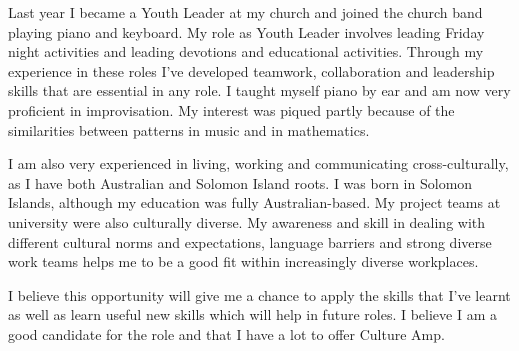 \documentclass[12pt, a4paper]{awesome-cv} %
\newcommand{\company}{Culture Amp}
\begin{document}
\begin{cvletter}
Last year I became a Youth Leader at my church and joined the church band playing piano and keyboard. My role as Youth Leader involves leading Friday night activities and leading devotions and educational activities. Through my experience in these roles I've developed teamwork, collaboration and leadership skills that are essential in any role. I taught myself piano by ear and am now very proficient in improvisation. My interest was piqued partly because of the similarities between  patterns in music and in mathematics.

I am also very experienced in living, working and communicating cross-culturally, as I have both Australian and Solomon Island roots. I was born in Solomon Islands, although my education was fully Australian-based. My project teams at university were also culturally diverse. My awareness and skill in dealing with different cultural norms and expectations, language barriers and strong diverse work teams helps me to be a good fit within increasingly diverse workplaces.  

I believe this opportunity will give me a chance to apply the skills that I've learnt as well as learn useful new skills which will help in future roles. I believe I am a good candidate for the role and that I have a lot to offer \company.


\end{cvletter}


\makeletterclosing %
\end{document}
